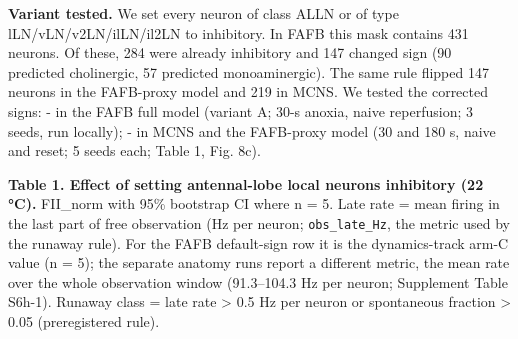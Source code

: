 \documentclass[11pt]{article}
\begin{document}
\textbf{Variant tested.} We set every neuron of class ALLN or of type lLN/vLN/v2LN/ilLN/il2LN to inhibitory. In FAFB this mask contains 431 neurons. Of these, 284 were already inhibitory and 147 changed sign (90 predicted cholinergic, 57 predicted monoaminergic). The same rule flipped 147 neurons in the FAFB-proxy model and 219 in MCNS. We tested the corrected signs:
- in the FAFB full model (variant A; 30-s anoxia, naive reperfusion; 3 seeds, run locally);
- in MCNS and the FAFB-proxy model (30 and 180 s, naive and reset; 5 seeds each; Table 1, Fig. 8c).

\textbf{Table 1. Effect of setting antennal-lobe local neurons inhibitory (22 °C).} FII\_norm with 95\% bootstrap CI where n = 5. Late rate = mean firing in the last part of free observation (Hz per neuron; \texttt{obs\_late\_Hz}, the metric used by the runaway rule). For the FAFB default-sign row it is the dynamics-track arm-C value (n = 5); the separate anatomy runs report a different metric, the mean rate over the whole observation window (91.3--104.3 Hz per neuron; Supplement Table S6h-1). Runaway class = late rate \textgreater{} 0.5 Hz per neuron or spontaneous fraction \textgreater{} 0.05 (preregistered rule).
\end{document}
